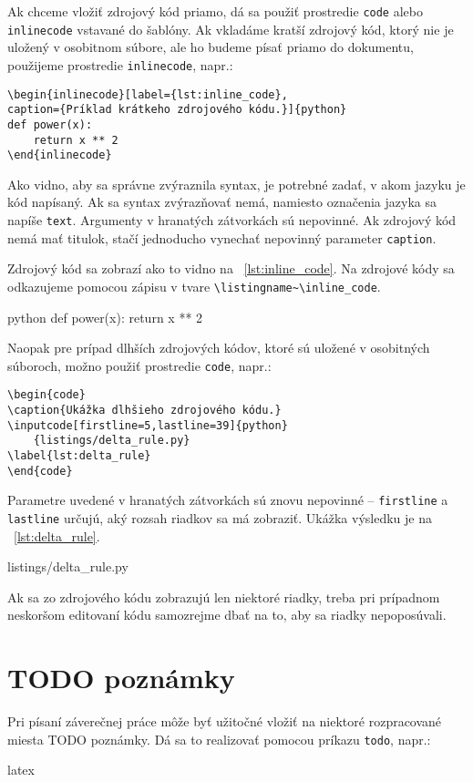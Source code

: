 Ak chceme vložiť zdrojový kód priamo, dá sa použiť prostredie \texttt{code} alebo \texttt{inlinecode} vstavané do šablóny. Ak vkladáme kratší zdrojový kód, ktorý nie je uložený v osobitnom súbore, ale ho budeme písať priamo do dokumentu, použijeme prostredie \texttt{inlinecode}, napr.:
\begin{Verbatim}
\begin{inlinecode}[label={lst:inline_code},
caption={Príklad krátkeho zdrojového kódu.}]{python}
def power(x):
	return x ** 2
\end{inlinecode}
\end{Verbatim}
Ako vidno, aby sa správne zvýraznila syntax, je potrebné zadať, v akom jazyku je kód napísaný. Ak sa syntax zvýrazňovať nemá, namiesto označenia jazyka sa napíše \texttt{text}. Argumenty v hranatých zátvorkách sú nepovinné. Ak zdrojový kód nemá mať titulok, stačí jednoducho vynechať nepovinný parameter \texttt{caption}.

Zdrojový kód sa zobrazí ako to vidno na \listingname~\ref{lst:inline_code}. Na zdrojové kódy sa odkazujeme pomocou zápisu v tvare \texttt{{\textbackslash}listingname\textasciitilde{\textbackslash}inline\_code}.

\begin{inlinecode}[label={lst:inline_code},
caption={Príklad krátkeho zdrojového kódu.}]{python}
def power(x):
	return x ** 2
\end{inlinecode}
Naopak pre prípad dlhších zdrojových kódov, ktoré sú uložené v osobitných súboroch, možno použiť prostredie \texttt{code}, napr.:
\begin{Verbatim}
\begin{code}
\caption{Ukážka dlhšieho zdrojového kódu.}
\inputcode[firstline=5,lastline=39]{python}
	{listings/delta_rule.py}
\label{lst:delta_rule}
\end{code}
\end{Verbatim}

Parametre uvedené v hranatých zátvorkách sú znovu nepovinné -- \texttt{firstline} a \texttt{lastline} určujú, aký rozsah riadkov sa má zobraziť. Ukážka výsledku je na \listingname~\ref{lst:delta_rule}.
\begin{code}
\caption{Ukážka dlhšieho zdrojového kódu.}
	{listings/delta_rule.py}
\label{lst:delta_rule}
\end{code}
Ak sa zo zdrojového kódu zobrazujú len niektoré riadky, treba pri prípadnom neskoršom editovaní kódu samozrejme dbať na to, aby sa riadky nepoposúvali.

\section{TODO poznámky}

Pri písaní záverečnej práce môže byť užitočné vložiť na niektoré rozpracované miesta TODO poznámky. Dá sa to realizovať pomocou príkazu \texttt{todo}, napr.:
\begin{inlinecode}{latex}
\end{inlinecode}

